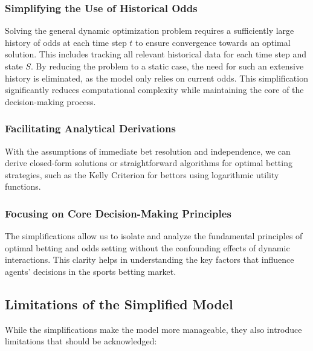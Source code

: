 \subsubsection{Simplifying the Use of Historical Odds}

Solving the general dynamic optimization problem requires a sufficiently large history of odds at each time step \( t \) to ensure convergence towards an optimal solution. This includes tracking all relevant historical data for each time step and state \( S \). By reducing the problem to a static case, the need for such an extensive history is eliminated, as the model only relies on current odds. This simplification significantly reduces computational complexity while maintaining the core of the decision-making process.



\subsubsection{Facilitating Analytical Derivations}

With the assumptions of immediate bet resolution and independence, we can derive closed-form solutions or straightforward algorithms for optimal betting strategies, such as the Kelly Criterion for bettors using logarithmic utility functions.

\subsubsection{Focusing on Core Decision-Making Principles}

The simplifications allow us to isolate and analyze the fundamental principles of optimal betting and odds setting without the confounding effects of dynamic interactions. This clarity helps in understanding the key factors that influence agents' decisions in the sports betting market.

\subsection{Limitations of the Simplified Model}

While the simplifications make the model more manageable, they also introduce limitations that should be acknowledged:

